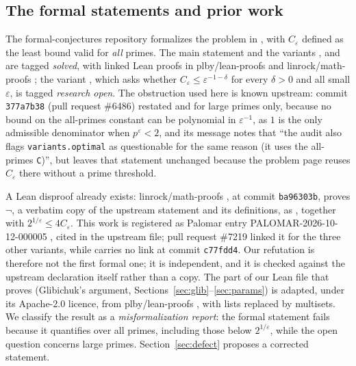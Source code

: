 \documentclass[11pt]{amsart}
\theoremstyle{plain}
\theoremstyle{definition}
\newcommand{\eps}{\varepsilon}
\begin{document}
\subsection*{The formal statements and prior work}
The formal-conjectures repository \cite{FC} formalizes the problem in , with $C_\eps$ defined as the least bound valid for \emph{all} primes.
The main statement  and the variants ,  and  are tagged \emph{solved}, with linked Lean proofs in plby/lean-proofs \cite{plby} and linrock/math-proofs \cite{linrock}; the variant , which asks whether $C_\eps\le\eps^{-1-\delta}$ for every $\delta>0$ and all small $\eps$, is tagged \emph{research open}.
The obstruction used here is known upstream: commit \texttt{377a7b38} (pull request \#6486) \cite{PR6486} restated  and  for large primes only, because no bound on the all-primes constant can be polynomial in $\eps^{-1}$, as $1$ is the only admissible denominator when $p^\eps<2$, and its message notes that ``the audit also flags \texttt{variants.optimal} as questionable for the same reason (it uses the all-primes \texttt{C})'', but leaves that statement unchanged because the problem page reuses $C_\eps$ there without a prime threshold.

A Lean disproof already exists: linrock/math-proofs \cite{linrock}, at commit \texttt{ba96303b}, proves $\neg$, a verbatim copy of the upstream statement and its definitions, as , together with $2^{1/\eps}\le4C_\eps$.
This work is registered as Palomar entry PALOMAR-2026-10-12-000005 \cite{Palomar}, cited in the upstream file; pull request \#7219 \cite{PR7219} linked it for the three other variants, while  carries no link at commit \texttt{c77fdd4}.
Our refutation is therefore not the first formal one; it is independent, and it is checked against the upstream declaration itself rather than a copy.
The part of our Lean file that proves  (Glibichuk's argument, Sections~\ref{sec:glib}--\ref{sec:params}) is adapted, under its Apache-2.0 licence, from plby/lean-proofs \cite{plby}, with lists replaced by multisets.
We classify the result as a \emph{misformalization report}: the formal statement fails because it quantifies over all primes, including those below $2^{1/\eps}$, while the open question concerns large primes. Section~\ref{sec:defect} proposes a corrected statement.
\end{document}
